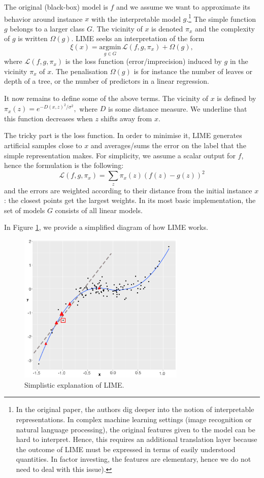 \documentclass[]{krantz}
\let\rmarkdownfootnote\footnote%
\def\footnote{\protect\rmarkdownfootnote}
\theoremstyle{definition}
\theoremstyle{definition}
\theoremstyle{definition}
\theoremstyle{remark}
\begin{document}
The original (black-box) model is \(f\) and we assume we want to
approximate its behavior around instance \(x\) with the interpretable
model
\(g\).\footnote{In the original paper, the authors dig deeper into the notion of interpretable representations. In complex machine learning settings (image recognition or natural language processing), the original features given to the model can be hard to interpret. Hence, this requires an additional translation layer because the outcome of LIME must be expressed in terms of easily understood quantities. In factor investing, the features are elementary, hence we do not need to deal with this issue).}
The simple function \(g\) belongs to a larger class \(G\). The vicinity
of \(x\) is denoted \(\pi_x\) and the complexity of \(g\) is written
\(\Omega(g)\). LIME seeks an interpretation of the form
\[\xi(x)=\underset{g \in G}{\text{argmin}} \, \mathcal{L}(f,g,\pi_x)+\Omega(g),\]
where \(\mathcal{L}(f,g,\pi_x)\) is the loss function
(error/imprecision) induced by \(g\) in the vicinity \(\pi_x\) of \(x\).
The penalisation \(\Omega(g)\) is for instance the number of leaves or
depth of a tree, or the number of predictors in a linear regression.

It now remains to define some of the above terms. The vicinity of \(x\)
is defined by \(\pi_x(z)=e^{-D(x,z)^2/\sigma^2},\) where \(D\) is some
distance measure. We underline that this function decreases when \(z\)
shifts away from \(x\).

The tricky part is the loss function. In order to minimise it, LIME
generates artificial samples close to \(x\) and averages/sums the error
on the label that the simple representation makes. For simplicity, we
assume a scalar output for \(f\), hence the formulation is the
following: \[\mathcal{L}(f,g,\pi_x)=\sum_z \pi_x(z)(f(z)-g(z))^2\] and
the errors are weighted according to their distance from the initial
instance \(x\): the closest points get the largest weights. In its most
basic implementation, the set of models \(G\) consists of all linear
models.

In Figure \ref{fig:lime}, we provide a simplified diagram of how LIME
works.

\begin{figure}[b]

{\centering \includegraphics[width=300px]{images/lime} 

}

\caption{Simplistic explanation of LIME.}\label{fig:lime}
\end{figure}
\end{document}
